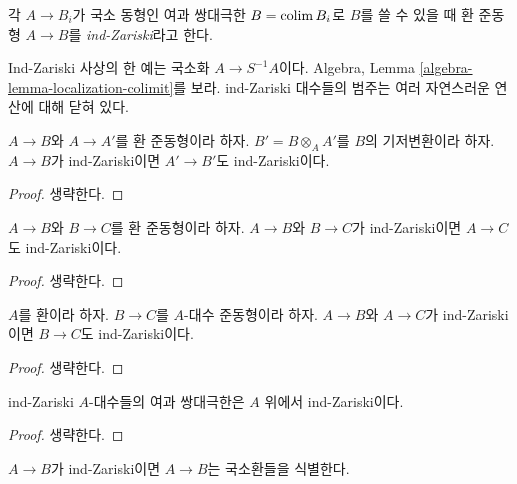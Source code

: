 \begin{definition}
\label{definition-ind-zariski}
각 $A \to B_i$가 국소 동형인 여과 쌍대극한
$B = \mathop{\mathrm{colim}}\nolimits B_i$로 $B$를 쓸 수 있을 때
환 준동형 $A \to B$를 {\it ind-Zariski}라고 한다.
\end{definition}

\noindent
Ind-Zariski 사상의 한 예는 국소화 $A \to S^{-1}A$이다.
Algebra, Lemma \ref{algebra-lemma-localization-colimit}를 보라.
ind-Zariski 대수들의 범주는 여러 자연스러운 연산에 대해 닫혀 있다.

\begin{lemma}
\label{lemma-base-change-ind-zariski}
$A \to B$와 $A \to A'$를 환 준동형이라 하자.
$B' = B \otimes_A A'$를 $B$의 기저변환이라 하자.
$A \to B$가 ind-Zariski이면 $A' \to B'$도 ind-Zariski이다.
\end{lemma}

\begin{proof}
생략한다.
\end{proof}

\begin{lemma}
\label{lemma-composition-ind-zariski}
$A \to B$와 $B \to C$를 환 준동형이라 하자.
$A \to B$와 $B \to C$가 ind-Zariski이면 $A \to C$도 ind-Zariski이다.
\end{lemma}

\begin{proof}
생략한다.
\end{proof}

\begin{lemma}
\label{lemma-ind-zariski-permanence}
$A$를 환이라 하자. $B \to C$를 $A$-대수 준동형이라 하자.
$A \to B$와 $A \to C$가 ind-Zariski이면 $B \to C$도 ind-Zariski이다.
\end{lemma}

\begin{proof}
생략한다.
\end{proof}

\begin{lemma}
\label{lemma-ind-ind-zariski}
ind-Zariski $A$-대수들의 여과 쌍대극한은 $A$ 위에서 ind-Zariski이다.
\end{lemma}

\begin{proof}
생략한다.
\end{proof}

\begin{lemma}
\label{lemma-ind-zariski-implies}
$A \to B$가 ind-Zariski이면 $A \to B$는 국소환들을 식별한다.
\end{lemma}

